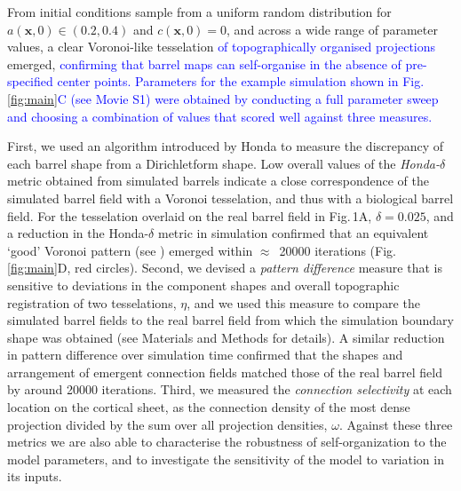 \documentclass[9pt,lineno]{elife}
\newcommand{\cmnt}[1]{\textcolor{blue}{#1}}
\newcommand{\metrics}[1]{\textcolor{revred}{#1}}
\newcommand{\mb}[1]{\mathbf{#1}}
\begin{document}
From initial conditions sample from a uniform random distribution for
$a(\mb{x},0)\in(0.2,0.4)$ and $c(\mb{x},0)=0$, and across a wide range of
parameter values,
a clear Voronoi-like tesselation \cmnt{of topographically organised
  projections} emerged, \cmnt{confirming that barrel maps can self-organise in
  the absence of pre-specified center points. Parameters for the example
  simulation shown in Fig.\,\ref{fig:main}C (see Movie S1) were obtained by
  conducting a full parameter sweep and choosing a combination of values that
  scored well against three measures.}

\metrics{First, we used an algorithm introduced by Honda to measure the
  discrepancy of each barrel shape from a Dirichletform shape. Low
  overall values of the \emph{Honda-}$\delta$ metric obtained from simulated
  barrels indicate a close correspondence of the simulated barrel field with a
  Voronoi tesselation, and thus with a biological barrel field. For the
  tesselation overlaid on the real barrel field in Fig.\,1A, $\delta=0.025$,
  and a reduction in the Honda-$\delta$ metric in simulation
  confirmed that an equivalent `good' Voronoi pattern} (see
    \citealp{senft_mouse_1991}) \metrics{emerged within $\approx$~20000
  iterations (Fig.\,\ref{fig:main}D, red circles). Second, we devised a
  \emph{pattern difference} measure that is sensitive to deviations in the
  component shapes and overall topographic registration of two tesselations,
  $\eta$, and we used this measure to compare the simulated barrel fields to
  the real barrel field from which the simulation boundary shape was obtained
  (see Materials and Methods for details). A similar reduction in pattern
  difference over simulation time confirmed that the shapes and arrangement of
  emergent connection fields matched those of the real barrel field by around
  20000 iterations. Third, we measured the \emph{connection selectivity} at
  each location on the cortical sheet, as the connection density of the most
  dense projection divided by the sum over all projection densities, $\omega$.}
%
\metrics{Against these three metrics we are also able to characterise the
  robustness of self-organization to the model parameters, and to investigate
  the sensitivity of the model to variation in its inputs.}
\end{document}

